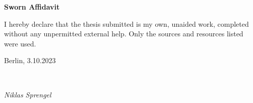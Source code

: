 \newpage

\thispagestyle{empty}

\begin{large}
\vspace*{1.4cm}
\noindent
\begin{center}
{\Large \textbf{Sworn Affidavit}}
\end{center}

\vspace*{0.5cm}

\noindent
I hereby declare that the thesis submitted is my own, unaided work, completed without any unpermitted external
help. Only the sources and resources listed were used.
\vspace{1cm}

\noindent
Berlin, 3.10.2023

\vspace{3cm}

\hspace*{7cm}%
\dotfill\\
\hspace*{8.5cm}%
\begin{flushright}
\textit{Niklas Sprengel}
\end{flushright}

\end{large}

